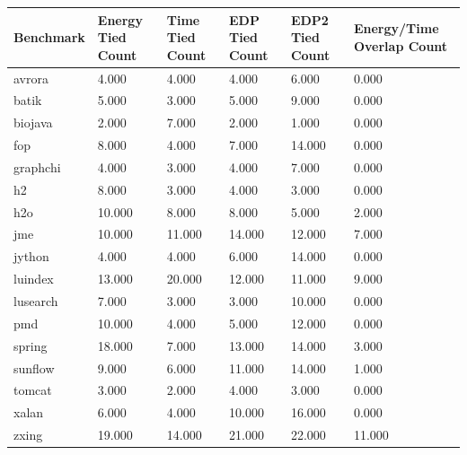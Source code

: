 \begin{tabular}{llllll}
\hline
Benchmark & Energy Tied Count & Time Tied Count & EDP Tied Count & EDP2 Tied Count & Energy/Time Overlap Count \\
\hline
avrora & 4.000 & 4.000 & 4.000 & 6.000 & 0.000 \\
batik & 5.000 & 3.000 & 5.000 & 9.000 & 0.000 \\
biojava & 2.000 & 7.000 & 2.000 & 1.000 & 0.000 \\
fop & 8.000 & 4.000 & 7.000 & 14.000 & 0.000 \\
graphchi & 4.000 & 3.000 & 4.000 & 7.000 & 0.000 \\
h2 & 8.000 & 3.000 & 4.000 & 3.000 & 0.000 \\
h2o & 10.000 & 8.000 & 8.000 & 5.000 & 2.000 \\
jme & 10.000 & 11.000 & 14.000 & 12.000 & 7.000 \\
jython & 4.000 & 4.000 & 6.000 & 14.000 & 0.000 \\
luindex & 13.000 & 20.000 & 12.000 & 11.000 & 9.000 \\
lusearch & 7.000 & 3.000 & 3.000 & 10.000 & 0.000 \\
pmd & 10.000 & 4.000 & 5.000 & 12.000 & 0.000 \\
spring & 18.000 & 7.000 & 13.000 & 14.000 & 3.000 \\
sunflow & 9.000 & 6.000 & 11.000 & 14.000 & 1.000 \\
tomcat & 3.000 & 2.000 & 4.000 & 3.000 & 0.000 \\
xalan & 6.000 & 4.000 & 10.000 & 16.000 & 0.000 \\
zxing & 19.000 & 14.000 & 21.000 & 22.000 & 11.000 \\
\hline
\end{tabular}

